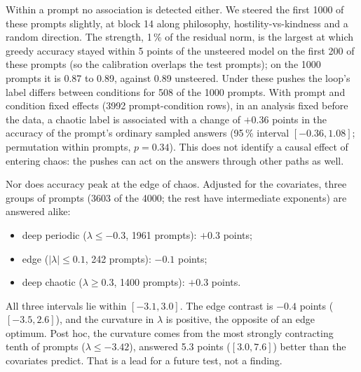 \documentclass[11pt,letterpaper]{article}
\begin{document}
Within a prompt no association is detected either. We steered the first 1000 of these prompts slightly, at block 14
along philosophy, hostility-vs-kindness and a random direction. The strength, 1\,\% of the residual norm, is the largest
at which greedy accuracy stayed within 5 points of the unsteered model on the first 200 of these prompts (so the
calibration overlaps the test prompts); on the 1000 prompts it is 0.87 to 0.89, against 0.89 unsteered. Under these
pushes the loop's label differs between conditions for 508 of the 1000 prompts. With prompt and condition fixed
effects (3992 prompt-condition rows), in an analysis fixed before the data, a chaotic label is associated with a change
of $+0.36$ points in the accuracy of the prompt's ordinary sampled answers (95\,\% interval $[-0.36,1.08]$;
permutation within prompts, $p=0.34$). This does not identify a causal effect of entering chaos: the pushes can act on
the answers through other paths as well.

Nor does accuracy peak at the edge of chaos. Adjusted for the covariates, three groups of prompts (3603 of the 4000;
the rest have intermediate exponents) are answered alike:
\begin{itemize}
  \item deep periodic ($\lambda\le-0.3$, 1961 prompts): $+0.3$ points;
  \item edge ($|\lambda|\le0.1$, 242 prompts): $-0.1$ points;
  \item deep chaotic ($\lambda\ge0.3$, 1400 prompts): $+0.3$ points.
\end{itemize}
All three intervals lie within $[-3.1,3.0]$. The edge contrast is $-0.4$ points ($[-3.5,2.6]$), and the curvature in
$\lambda$ is positive, the opposite of an edge optimum. Post hoc, the curvature comes from the most strongly
contracting tenth of prompts ($\lambda\le-3.42$), answered 5.3 points ($[3.0,7.6]$) better than the covariates
predict. That is a lead for a future test, not a finding.
\end{document}
